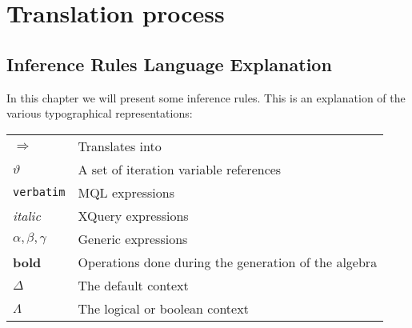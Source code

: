 \chapter{Translation process}

\section{Inference Rules Language Explanation}
\label{sect:translation:inferenceExplanation}
In this chapter we will present some inference rules. This is an explanation of
the various typographical representations:

\begin{tabular}{l|l}

  $\Longrightarrow$  & Translates into \\
  $\vartheta$ & A set of iteration variable references \\
  \verb!verbatim! & MQL expressions \\
  \textit{italic} & XQuery expressions \\
  $\alpha , \beta, \gamma$ & Generic expressions \\
  \textbf{bold} & Operations done during the generation of the algebra \\
  $\Delta$ & The default context \\
  $\Lambda$ & The logical or boolean context \\
  
\end{tabular}







